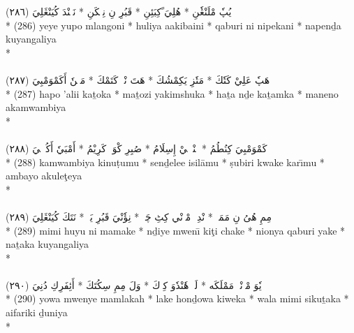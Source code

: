 \documentclass[a4paper, 12pt]{report}
\begin{document}
\begin{center}
\textarabic{(٢٨٦) \textcolor{mygreen}{يٖيٖ يُپٗ مْلَنْڠٗنِ  * هُلِيَ ََكِبَئِنِ  * قَبُرِ نِ نِپٖكَنِ  * نَپٖنْدَ كُيَنْڠَلِيَ }} \\* 
(286) yeye yupo mlangoni  * huliya aakibaini  * qaburi ni nipekani  * napenḏa kuyangaliya  \\* 
 \\ 
\\[8mm] 

\textarabic{(٢٨٧) \textcolor{mygreen}{هَپٗ عَلِيْ كَتٗكَ  * مَتٗزِ يَكِمْشُكَ  * هَتَ نْدٖ كَتَمْكَ  * مَنٖنٗ أَكَمْوَمْبِيَ }} \\* 
(287) hapo 'alii kaṯoka  * maṯozi yakimshuka  * haṯa nḏe kaṯamka  * maneno akamwambiya  \\* 
 \\ 
\\[8mm] 

\textarabic{(٢٨٨) \textcolor{mygreen}{كَمْوَمْبِيَ كِنُطُمُ  * سٖنْدٖلٖيْ إِسِلَامُ  * صُبِرِ كْوَكٖ كَرِيْمُ  * أَمْبَيٗ أَكُلٖٹٖيَ }} \\* 
(288) kamwambiya kinuṭumu  * senḏelee isilāmu  * ṣubiri kwake karı̄mu  * ambayo akuleţeya  \\* 
 \\ 
\\[8mm] 

\textarabic{(٢٨٩) \textcolor{mygreen}{مِمِ هُىُ نِ مَمَكٖ  * نْدِيٖ مْوٖنْي كِٹِ چَكٖ  * نِؤٗنْيَ قَبُرِ يَكٖ  * نَتَكَ كُيَنْڠَلِيَ }} \\* 
(289) mimi huyu ni mamake  * nḏiye mwenı̄ kiţi chake  * nionya qaburi yake  * naṯaka kuyangaliya  \\* 
 \\ 
\\[8mm] 

\textarabic{(٢٩٠) \textcolor{mygreen}{يٗوَ مْوٖنْيٖ مَمْلَكَه  * لَكٖ هٗنْدٗوَ كِوٖكَ  * وَلَ مِمِ سِكُتَكَ  * أَئِفَرِكِ دُنِيَ }} \\* 
(290) yowa mwenye mamlakah  * lake honḏowa kiweka  * wala mimi sikuṯaka  * aifariki ḏuniya  \\* 
 \\ 
\\[8mm] 


\end{center}
\end{document}
